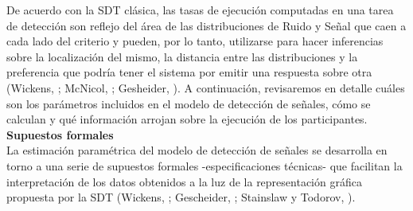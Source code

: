 De acuerdo con la SDT clásica, las tasas de ejecución computadas en una tarea de detección son reflejo del área de las distribuciones de Ruido y Señal que caen a cada lado del criterio y pueden, por lo tanto, utilizarse para hacer inferencias sobre la localización del mismo, la distancia entre las distribuciones y la preferencia que podría tener el sistema por emitir una respuesta sobre otra (Wickens, \citeyear{Wickens1}; McNicol, \citeyear{McNicol1}; Gesheider, \citeyear{Gescheider}). A continuación, revisaremos en detalle cuáles son los parámetros incluidos en el modelo de detección de señales, cómo se calculan y qué información arrojan sobre la ejecución de los participantes.\\

  \textbf{Supuestos formales}\\

La estimación paramétrica del modelo de detección de señales se desarrolla en torno a una serie de supuestos formales -especificaciones técnicas- que facilitan la interpretación de los datos obtenidos a la luz de la representación gráfica propuesta por la SDT (Wickens, \citeyear{Wickens1}; Gescheider, \citeyear{Gescheider}; Stainslaw y Todorov, \citeyear{Stainslaw1999}).\\ 

